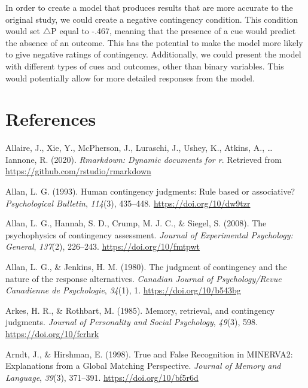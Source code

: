 \documentclass[
  english,
  man,floatsintext]{apa6}
\begin{document}
In order to create a model that produces results that are more accurate to the original study, we could create a negative contingency condition. This condition would set \(\triangle\)P equal to -.467, meaning that the presence of a cue would predict the absence of an outcome. This has the potential to make the model more likely to give negative ratings of contingency. Additionally, we could present the model with different types of cues and outcomes, other than binary variables. This would potentially allow for more detailed responses from the model.

\newpage

\hypertarget{references}{%
\section{References}\label{references}}

\begingroup
\setlength{\parindent}{-0.5in}
\setlength{\leftskip}{0.5in}

\hypertarget{refs}{}
\leavevmode\hypertarget{ref-R-rmarkdown}{}%
Allaire, J., Xie, Y., McPherson, J., Luraschi, J., Ushey, K., Atkins, A., \ldots{} Iannone, R. (2020). \emph{Rmarkdown: Dynamic documents for r}. Retrieved from \url{https://github.com/rstudio/rmarkdown}

\leavevmode\hypertarget{ref-allanHumanContingencyJudgments1993}{}%
Allan, L. G. (1993). Human contingency judgments: Rule based or associative? \emph{Psychological Bulletin}, \emph{114}(3), 435--448. \url{https://doi.org/10/dw9tzr}

\leavevmode\hypertarget{ref-allanPsychophysicsContingencyAssessment2008}{}%
Allan, L. G., Hannah, S. D., Crump, M. J. C., \& Siegel, S. (2008). The psychophysics of contingency assessment. \emph{Journal of Experimental Psychology: General}, \emph{137}(2), 226--243. \url{https://doi.org/10/fmtpwt}

\leavevmode\hypertarget{ref-allanJudgmentContingencyNature1980}{}%
Allan, L. G., \& Jenkins, H. M. (1980). The judgment of contingency and the nature of the response alternatives. \emph{Canadian Journal of Psychology/Revue Canadienne de Psychologie}, \emph{34}(1), 1. \url{https://doi.org/10/b543bg}

\leavevmode\hypertarget{ref-arkesMemoryRetrievalContingency1985}{}%
Arkes, H. R., \& Rothbart, M. (1985). Memory, retrieval, and contingency judgments. \emph{Journal of Personality and Social Psychology}, \emph{49}(3), 598. \url{https://doi.org/10/fcrhrk}

\leavevmode\hypertarget{ref-arndtTrueFalseRecognition1998}{}%
Arndt, J., \& Hirshman, E. (1998). True and False Recognition in MINERVA2: Explanations from a Global Matching Perspective. \emph{Journal of Memory and Language}, \emph{39}(3), 371--391. \url{https://doi.org/10/bf5r6d}
\end{document}
